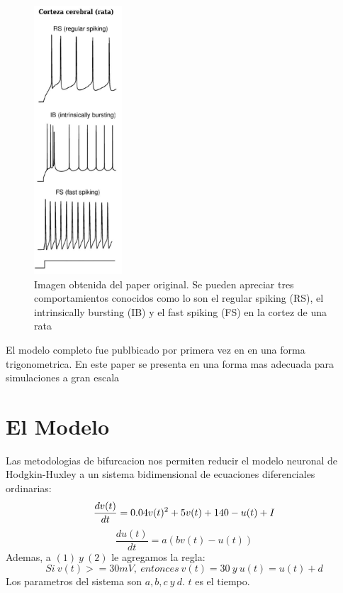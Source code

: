 \documentclass[12pt]{article}
\begin{document}
\begin{figure}
    \centering
        \includegraphics[height=10cm]{images/rata.jpg}
    \caption[fontsize=2pt]{Imagen obtenida del paper original. Se pueden apreciar tres comportamientos conocidos como lo son el regular spiking (RS), el intrinsically bursting (IB) y el fast spiking (FS) en la cortez de una rata}
\end{figure}

El modelo completo fue publbicado por primera vez en \cite{modeloPrimero} en una forma trigonometrica. En este paper se presenta en una forma mas adecuada para simulaciones a gran escala

\section{El Modelo}
Las metodologias de bifurcacion \cite{bifurcacion} nos permiten reducir el modelo neuronal de Hodgkin-Huxley a un sistema bidimensional de ecuaciones diferenciales ordinarias:
\begin{equation}
    \frac{dv(t)}{dt} = 0.04 v(t)^2 + 5 v(t) + 140 - u(t) + I\\
\end{equation}
\begin{equation}
    \frac{du(t)}{dt} = a(b v(t) - u(t))
\end{equation}
Ademas, a $(1) \ y  \ (2)$ le agregamos la regla:
\begin{equation}
    Si \ v(t) >= 30 mV,\ entonces \
        v(t) = 30 \ y \ u(t) = u(t) + d
\end{equation}
Los parametros del sistema son $a, b, c \ y \ d$. $t$ es el tiempo. \\ \\
\end{document}
